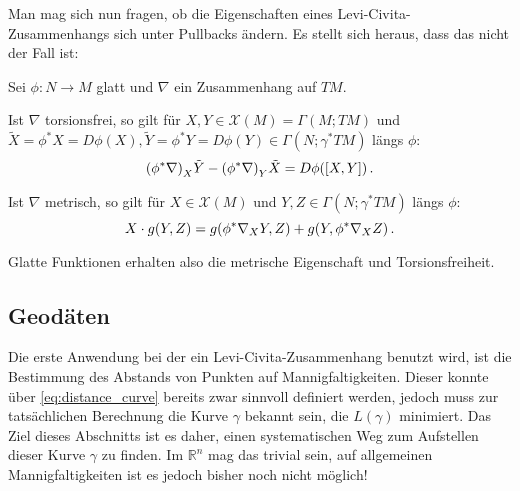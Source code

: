 \documentclass[../H_Analysis_main.tex]{subfiles}
\begin{document}
Man mag sich nun fragen, ob die Eigenschaften eines Levi-Civita-Zusammenhangs sich unter Pullbacks ändern. Es stellt sich heraus, dass das nicht der Fall ist:
\begin{satz}
Sei $\phi: N \rightarrow M$ glatt und $\nabla$ ein Zusammenhang auf $TM$.

Ist $\nabla$ torsionsfrei, so gilt für $X, Y \in \mathcal{X}(M) = \Gamma(M; TM)$ und $\tilde{X} = \phi^* X = D \phi(X), \tilde{Y} = \phi^* Y = D\phi(Y) \in \Gamma(N; \gamma^* TM)$ längs $\phi$:
\begin{equation}
\qty(\phi^* \nabla)_X \tilde{Y} - \qty(\phi^* \nabla)_Y \tilde{X} = D\phi\qty([X, Y]) \, .
\end{equation}

Ist $\nabla$ metrisch, so gilt für $X \in \mathcal{X}(M)$ und $Y, Z \in \Gamma(N; \gamma^* TM)$ längs $\phi$:
\begin{equation}
X \cdot g(Y, Z) = g\qty(\phi^* \nabla_X Y, Z) + g\qty(Y, \phi^* \nabla_X Z) \, .
\end{equation}
\end{satz}

Glatte Funktionen erhalten also die metrische Eigenschaft und Torsionsfreiheit.





		\subsection{Geodäten}
Die erste Anwendung bei der ein Levi-Civita-Zusammenhang benutzt wird, ist die Bestimmung des Abstands von Punkten auf Mannigfaltigkeiten. Dieser konnte über \eqref{eq:distance_curve} bereits zwar sinnvoll definiert werden, jedoch muss zur tatsächlichen Berechnung die Kurve $\gamma$ bekannt sein, die $L(\gamma)$ minimiert. Das Ziel dieses Abschnitts ist es daher, einen systematischen Weg zum Aufstellen dieser Kurve $\gamma$ zu finden. Im $\mathbb{R}^n$ mag das trivial sein, auf allgemeinen Mannigfaltigkeiten ist es jedoch bisher noch nicht möglich!
\end{document}
